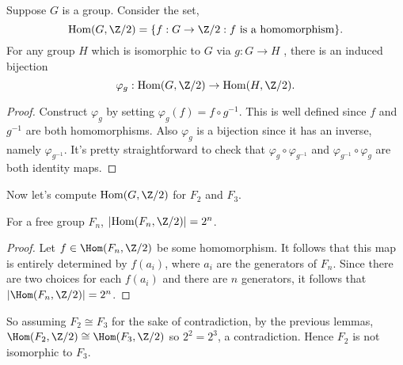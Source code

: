\documentclass[11pt,letterpaper]{article}
\begin{document}
\begin{lemma}\label{invariant}
  Suppose $G$ is a group. Consider the set,
  \[\textrm{Hom}(G, \Z /2) = \{ f : G \to \Z /2 : f \textrm{ is a homomorphism}\}.\]
  For any group $H$ which is isomorphic to $G$ via $g : G \to H$ , there is an induced bijection
  \[\varphi_g : \textrm{Hom}(G, \Z /2) \to \textrm{Hom}(H, \Z /2).\]  
\end{lemma}
\begin{proof}
  Construct $\varphi_g$ by setting $\varphi_g(f) = f\circ g^{-1}$. This is well defined since $f$ and $g^{-1}$ are both homomorphisms. Also $\varphi_g$ is a bijection since it has an inverse, namely $\varphi_{g^{-1}}$. It's pretty straightforward to check that $\varphi_g\circ \varphi_{g^{-1}}$ and $\varphi_{g^{-1}}\circ \varphi_{g}$ are both identity maps.        
\end{proof}

Now let's compute $\textrm{Hom}(G, \Z /2)$ for $F_2$ and $F_3$.

\begin{lemma}
  For a free group $F_n$, $|\textrm{Hom}(F_n, \Z /2)| = 2^n$.  
\end{lemma}
\begin{proof}
  Let $f\in \Hom(F_n, \Z /2)$ be some homomorphism. It follows that this map is entirely determined by $f(a_i)$, where $a_i$ are the generators of $F_n$. Since there are two choices for each $f(a_i)$ and there are $n$ generators, it follows that $|\Hom(F_n, \Z /2)|=2^n$.       
\end{proof}

So assuming $F_2\cong F_3$ for the sake of contradiction, by the previous lemmas, $\Hom(F_2, \Z /2) \cong \Hom(F_3, \Z /2)$ so $2^2=2^3$, a contradiction. Hence $F_2$ is not isomorphic to $F_3$.
\end{document}
